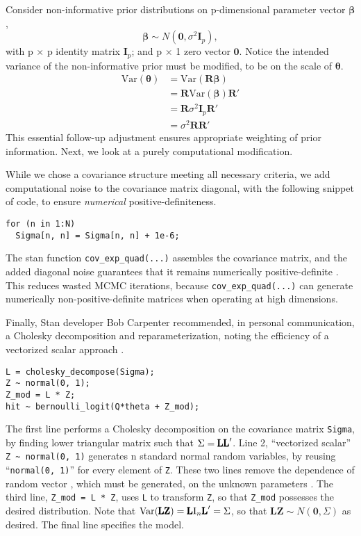 Consider non-informative prior distributions on p-dimensional parameter vector $\pmb{\beta}$,
\begin{equation}
\pmb{\beta} \sim N(\pmb{0}, \sigma^{2}\pmb{I}_{p}), 
\end{equation}
with p $\times$ p identity matrix $\pmb{I}_{p}$; and p $\times$ 1 zero vector $\pmb{0}$. Notice the intended variance of the non-informative prior must be modified, to be on the scale of $\pmb{\theta}$.
\begin{align}
\text{Var}(\pmb{\theta}) &= \text{Var}(\pmb{R \beta}) \\
&= \pmb{R}\text{Var}(\pmb{\beta})\pmb{R}' \\
&= \pmb{R}\sigma^{2}\pmb{I}_{p}\pmb{R}' \\
&= \sigma^{2} \pmb{R}\pmb{R}'
\end{align}
This essential follow-up adjustment ensures appropriate weighting of prior information. Next, we look at a purely computational modification.

While we chose a covariance structure meeting all necessary criteria, we add computational noise to the covariance matrix diagonal, with the following snippet of code, to ensure {\it numerical} positive-definiteness.
\begin{verbatim}
for (n in 1:N)
  Sigma[n, n] = Sigma[n, n] + 1e-6;
\end{verbatim}
The stan function \verb|cov_exp_quad(...)| assembles the covariance matrix, and the added diagonal noise guarantees that it remains numerically positive-definite \cite{Trangucci2017}. This reduces wasted MCMC iterations, because \verb|cov_exp_quad(...)| can generate numerically non-positive-definite matrices when operating at high dimensions.

Finally, Stan developer Bob Carpenter recommended, in personal communication, a Cholesky decomposition and reparameterization, noting the efficiency of a vectorized scalar approach \cite{Carpenter}.
\begin{verbatim}
L = cholesky_decompose(Sigma);  
Z ~ normal(0, 1);  
Z_mod = L * Z; 
hit ~ bernoulli_logit(Q*theta + Z_mod);
\end{verbatim}
The first line performs a Cholesky decomposition on the covariance matrix \verb|Sigma|, by finding lower triangular matrix  such that $\Sigma = \text{\pmb{LL}}'$. Line 2, ``vectorized scalar'' \verb|Z ~ normal(0, 1)| generates n standard normal random variables, by reusing ``\verb|normal(0, 1)|'' for every element of \verb|Z|. These two lines remove the dependence of random vector , which must be generated, on the unknown parameters \citep{Trangucci2017}. The third line, \verb|Z_mod = L * Z|, uses \verb|L| to transform \verb|Z|, so that \verb|Z_mod| possesses the desired distribution. Note that $\text{Var}(\text{\pmb{LZ}}) = \text{\pmb{L}} \text{I}_{n}\text{\pmb{L}}' = \Sigma$, so that $\pmb{LZ} \sim N(\pmb{0}, \Sigma)$ as desired. The final line specifies the model.

